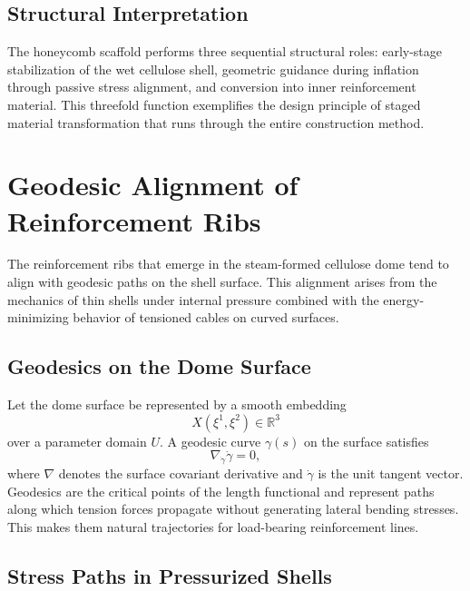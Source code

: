 \documentclass[12pt,a4paper]{article}
\begin{document}
\subsection{Structural Interpretation}

The honeycomb scaffold performs three sequential structural roles:
early-stage stabilization of the wet cellulose shell, geometric
guidance during inflation through passive stress alignment, and
conversion into inner reinforcement material. This threefold function
exemplifies the design principle of staged material transformation that
runs through the entire construction method.

\section{Geodesic Alignment of Reinforcement Ribs}

The reinforcement ribs that emerge in the steam-formed cellulose dome
tend to align with geodesic paths on the shell surface. This alignment
arises from the mechanics of thin shells under internal pressure
combined with the energy-minimizing behavior of tensioned cables on
curved surfaces.

\subsection{Geodesics on the Dome Surface}

Let the dome surface be represented by a smooth embedding
\begin{equation}
X(\xi^1,\xi^2) \in \mathbb{R}^3
\end{equation}
over a parameter domain $U$. A geodesic curve $\gamma(s)$ on the
surface satisfies
\begin{equation}
\nabla_{\dot{\gamma}} \dot{\gamma} = 0,
\end{equation}
where $\nabla$ denotes the surface covariant derivative and
$\dot{\gamma}$ is the unit tangent vector. Geodesics are the critical
points of the length functional and represent paths along which tension
forces propagate without generating lateral bending stresses. This
makes them natural trajectories for load-bearing reinforcement lines.

\subsection{Stress Paths in Pressurized Shells}
\end{document}
